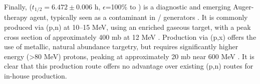 Finally,  ($t_{1/2}=6.472\pm0.006$ h, $\epsilon$=100\% to   \cite{Tuli2003}) is a diagnostic and emerging Auger-therapy agent, typically seen as a contaminant in / generators 
\cite{Kovacs1991}.
It is commonly produced via (p,n) at 10--15 MeV, using an enriched  gaseous target, with a peak cross section of approximately 400 mb at 12 MeV \cite{Kovacs1991}.
Production via (p,x) offers the use of metallic, natural abundance targetry, but requires significantly higher energy (\textgreater 80 MeV) protons, peaking at approximately 20 mb near 600 MeV \cite{Titarenko2011}.
It is clear that this production route offers no advantage over existing (p,n) routes for in-house production.



























